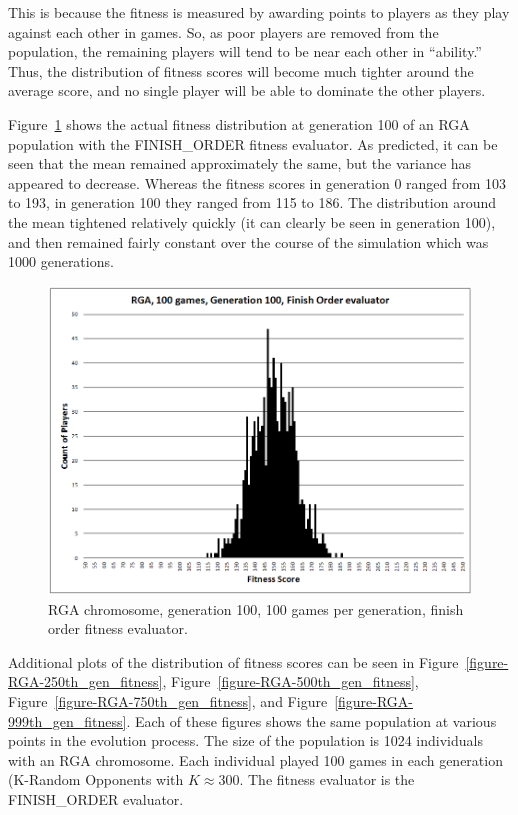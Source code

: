 This is because the fitness is measured by awarding points to players as they
play against each other in games. So, as poor players are removed from the
population, the remaining players will tend to be near each other in
``ability.'' Thus, the distribution of fitness scores will become much tighter
around the average score, and no single player will be able to dominate the
other players.

Figure~\ref{figure-100th_gen_fitness} shows the actual fitness distribution at
generation 100 of an RGA population with the FINISH\_ORDER fitness evaluator. As
predicted, it can be seen that the mean remained approximately the same, but the
variance has appeared to decrease. Whereas the fitness scores in generation 0
ranged from 103 to 193, in generation 100 they ranged from 115 to 186. The
distribution around the mean tightened relatively quickly (it can clearly be
seen in generation 100), and then remained fairly constant over the course of
the simulation which was 1000 generations.

\begin{figure}[htp]
\centerline{\includegraphics[width=0.75\columnwidth]{Figures/RGA_1024_G100_N100_FO.png}}
\caption[RGA Fitness Distribution, 100th Generation]{RGA chromosome, generation
100, 100 games per generation, finish order fitness evaluator.}
\label{figure-100th_gen_fitness}
\end{figure}

Additional plots of the distribution of fitness scores can be seen in
Figure~\ref{figure-RGA-250th_gen_fitness},
Figure~\ref{figure-RGA-500th_gen_fitness},
Figure~\ref{figure-RGA-750th_gen_fitness}, and
Figure~\ref{figure-RGA-999th_gen_fitness}. Each of these figures shows the same
population at various points in the evolution process. The size of the
population is 1024 individuals with an RGA chromosome. Each individual played
100 games in each generation (K-Random Opponents with \(K\approx300\). The
fitness evaluator is the FINISH\_ORDER evaluator.

